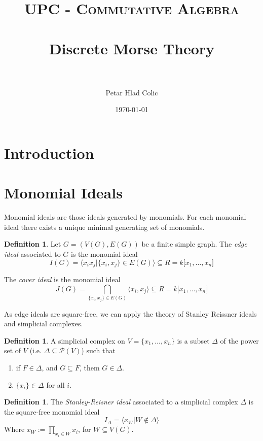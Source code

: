 \documentclass[paper=a4, fontsize=11pt]{scrartcl} %
\title{
\normalfont \normalsize
\textsc{UPC - Commutative Algebra} \\ [25pt] %
\horrule{0.5pt} \\[0.4cm] %
\huge Discrete Morse Theory \\ %
\horrule{2pt} \\[0.5cm] %
}
\author{Petar Hlad Colic} %
\date{\normalsize\today} %
\theoremstyle{plain}
\theoremstyle{definition}
\newtheorem{defn}[thm]{Definition}
\begin{document}
\maketitle %



\section{Introduction}


\section{Monomial Ideals}
Monomial ideals are those ideals generated by monomials. For each monomial ideal there exists a unique minimal generating set of monomials.

\begin{defn}
Let $G = (V(G),E(G))$ be a finite simple graph. The \textit{edge ideal} associated to $G$ is the monomial ideal
$$ I(G) = \langle x_i x_j \vert \lbrace	x_i, x_j \rbrace \in E(G) \rangle \subseteq R = k \lbrack x_1, \dots, x_n \rbrack$$

The \textit{cover ideal} is the monomial ideal
$$J(G) = \bigcap_{\lbrace	x_i, x_j \rbrace \in E(G)}  \langle x_i, x_j \rangle \subseteq R = k \lbrack x_1, \dots, x_n \rbrack$$

\end{defn}

As edge ideals are square-free, we can apply the theory of Stanley Reissner ideals and simplicial complexes. \cite{Mo12}

\begin{defn}
A simplicial complex on $V = \lbrace x_1, \dots , x_n \rbrace$ is a subset $\Delta$ of the power set of $V$ (i.e. $\Delta \subseteq \mathcal{P}(V)$) such that
\renewcommand{\labelenumi}{(\roman{enumi})}
\begin{enumerate}
\item if $F \in \Delta$, and $G\subseteq F$, them $G \in \Delta$.
\item $\lbrace x_i \rbrace \in \Delta$ for all $i$.
\end{enumerate}
\end{defn}

\begin{defn}
The \textit{Stanley-Reisner ideal} associated to a simplicial complex $\Delta$ is the square-free monomial ideal $$I_{\Delta} = \langle x_{W} \vert W \notin \Delta \rangle$$
Where $x_{W} := \prod_{x_i \in W} x_i$, for $W \subseteq V(G)$.
\end{defn}
\end{document}
